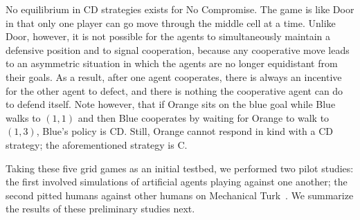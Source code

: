 No equilibrium in CD strategies exists for No Compromise.  The game
is like Door in that only one player can go move through the middle
cell at a time.  Unlike Door, however, it is not possible for the
agents to simultaneously maintain a defensive position and to signal
cooperation, because any cooperative move leads to an asymmetric
situation in which the agents are no longer equidistant from their
goals.
As a result, after one agent cooperates, there is always an incentive
for the other agent to defect, and there is nothing the cooperative
agent can do to defend itself.  Note however, that if Orange sits on
the blue goal while Blue walks to $(1,1)$ and then Blue cooperates by
waiting for Orange to walk to $(1,3)$, Blue's policy is CD.  Still,
Orange cannot respond in kind with a CD strategy; the aforementioned
strategy is C.

Taking these five grid games as an initial testbed, we performed two
pilot studies: the first involved simulations of artificial agents
playing against one another; the second pitted humans against other
humans on Mechanical Turk~\cite{}.
We summarize the results of these preliminary studies next.

